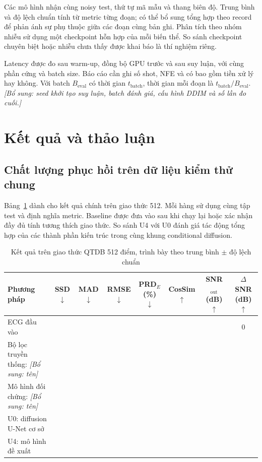 \documentclass[conference]{IEEEtran}
\newcommand{\pending}{\textemdash}
\newcommand{\draftnote}[1]{\textit{[Bổ sung: #1]}}
\begin{document}
Các mô hình nhận cùng noisy test, thứ tự mã mẫu và thang biên độ. Trung bình và độ lệch chuẩn tính từ metric từng đoạn; có thể bổ sung tổng hợp theo record để phản ánh sự phụ thuộc giữa các đoạn cùng bản ghi. Phân tích theo nhóm nhiễu sử dụng một checkpoint hỗn hợp của mỗi biến thể. So sánh checkpoint chuyên biệt hoặc nhiễu chưa thấy được khai báo là thí nghiệm riêng.

Latency được đo sau warm-up, đồng bộ GPU trước và sau suy luận, với cùng phần cứng và batch size. Báo cáo cần ghi số shot, NFE và có bao gồm tiền xử lý hay không. Với batch $B_{\mathrm{eval}}$ có thời gian $t_{\mathrm{batch}}$, thời gian mỗi đoạn là $t_{\mathrm{batch}}/B_{\mathrm{eval}}$. \draftnote{seed khởi tạo suy luận, batch đánh giá, cấu hình DDIM và số lần đo cuối.}

\section{Kết quả và thảo luận}
\subsection{Chất lượng phục hồi trên dữ liệu kiểm thử chung}
Bảng~\ref{tab:mainresults} dành cho kết quả chính trên giao thức 512. Mỗi hàng sử dụng cùng tập test và định nghĩa metric. Baseline được đưa vào sau khi chạy lại hoặc xác nhận đầy đủ tính tương thích giao thức. So sánh U4 với U0 đánh giá tác động tổng hợp của các thành phần kiến trúc trong cùng khung conditional diffusion.

\begin{table}[t]
 \caption{Kết quả trên giao thức QTDB 512 điểm, trình bày theo trung bình $\pm$ độ lệch chuẩn}
 \label{tab:mainresults}
 \centering\small
 \begin{tabular}{@{}lccccccc@{}}
 \toprule
 Phương pháp & SSD $\downarrow$ & MAD $\downarrow$ & RMSE $\downarrow$ & PRD$_E$ (\%) $\downarrow$ & CosSim $\uparrow$ & SNR$_{\mathrm{out}}$ (dB) $\uparrow$ & $\Delta$SNR (dB) $\uparrow$\\
 \midrule
 ECG đầu vào & \pending & \pending & \pending & \pending & \pending & \pending & 0\\
 Bộ lọc truyền thống: \draftnote{tên} & \pending & \pending & \pending & \pending & \pending & \pending & \pending\\
 Mô hình đối chứng: \draftnote{tên} & \pending & \pending & \pending & \pending & \pending & \pending & \pending\\
 U0: diffusion U-Net cơ sở & \pending & \pending & \pending & \pending & \pending & \pending & \pending\\
 U4: mô hình đề xuất & \pending & \pending & \pending & \pending & \pending & \pending & \pending\\
 \bottomrule
 \end{tabular}
\end{table}
\end{document}
